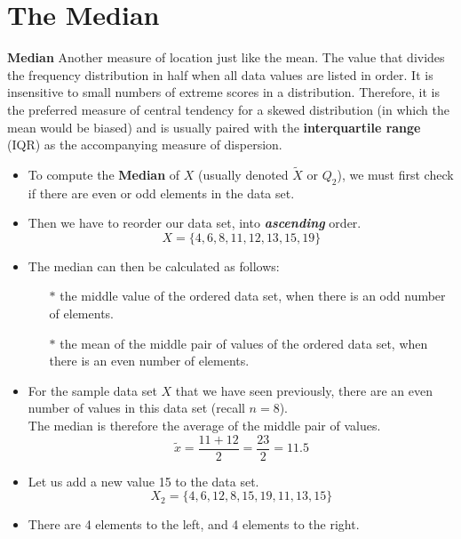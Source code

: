 
\section{The Median}
\textbf{Median} Another measure of location just like the mean. The value that divides the frequency distribution in half when all data values are listed in order. It is insensitive to small numbers of extreme scores in a distribution. Therefore, it is the preferred measure of central tendency for a skewed distribution (in which the mean would be biased) and is usually paired with the \textbf{interquartile range} (IQR) as the accompanying measure of dispersion.
\begin{itemize}
\item To compute the \textbf{Median} of $X$ (usually denoted $\tilde{X}$ or $Q_2$), we must first check if there are even or odd elements in the data set. 
\item Then we have to reorder our data set, into \textbf{\textit{ascending}} order.
\[  X = \{4, 6, 8, 11, 12, 13, 15, 19\}\]
\item The median can then be calculated as follows:
\begin{itemize}
\item[$\ast$] the middle value of the ordered data set, when there is an odd number of elements.
\item[$\ast$] the mean of the middle pair of values of the ordered data set, when there is an even number of elements.
\end{itemize}
\item For the sample data set $X$ that we have seen previously, there are an even number of values in this data set (recall $n=8$). \\ \smallskip The median is therefore the average of the middle pair of values.
\[ \tilde{x} = \frac{11+12}{2} = \frac{23}{2} = 11.5 \]

\medskip
\item Let us add a new value 15 to the data set.
\[X_2 = \{4,6,12,8,15,19,11, 13,15\}\]
\item There are 4 elements to the left, and 4 elements to the right.
\end{itemize}


